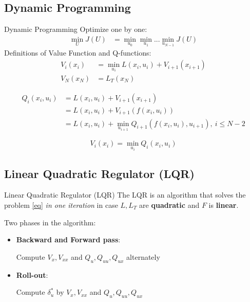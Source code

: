 \documentclass{beamer}
\begin{document}
\subsection{Dynamic Programming}
\begin{frame}{Dynamic Programming}
Optimize one by one:
\begin{equation}
\begin{split}
\min_{U} J(U) &= \min_{u_0} \min_{u_1} ... \min_{u_{N-1}} J(U)
\end{split}
\end{equation}
Definitions of Value Function and Q-functions:
\begin{equation}
\begin{split}
\label{vl}
V_i(x_i ) &= \min_{u_i}L(x_i,u_i) + V_{i+1}(x_{i+1}) \\
		V_N(x_N) &= L_T(x_N)
\end{split}
\end{equation}

\begin{equation}
\begin{split}
Q_i(x_i,u_i) &= L(x_i,u_i) + V_{i+1}(x_{i+1}) \\
				&= L(x_i,u_i) + V_{i+1}(f(x_i,u_i)) \\
				&= L(x_i,u_i) + \min_{u_{i+1}} Q_{i+1}(f(x_i,u_i), u_{i+1}),\ i \le N-2
\end{split}
\end{equation}

\begin{equation}
V_i(x_i) = \min_{u_i} Q_i(x_i, u_i) 
\end{equation}
\end{frame}

\subsection{Linear Quadratic Regulator (LQR)}

\begin{frame}{Linear Quadratic Regulator (LQR)}
The LQR is an algorithm that solves the problem \ref{eq} \emph{ in one iteration}
in case $L, L_T$ are \textbf{quadratic} and $F$ is \textbf{linear}.

\medskip

Two phases in the algorithm: 
\begin{itemize}
\item \textbf{Backward and Forward pass}: 

Compute $V_x, V_{xx}$ and $Q_u, Q_{uu}, Q_{ux}$ alternately

\item \textbf{Roll-out}: 

Compute $\delta_u^*$ by $V_x, V_{xx}$ and $Q_u, Q_{uu}, Q_{ux}$

\end{itemize}


\end{frame}
\end{document}
